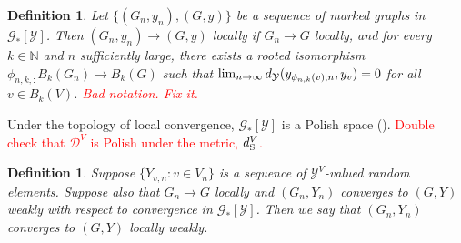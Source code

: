 \documentclass[12pt]{article}
\newcommand{\mb}{\mathbb}
\newcommand{\mc}{\mathcal}
\newcommand{\ra}{\rightarrow}
\newcommand{\te}{\text}
\newcommand{\tr}{\textcolor{red}}
\newcommand{\cad}{\mc{D}}							%
\newcommand{\stmet}[1]{
\ifstrempty{#1}{
	d_{\te{S}}}{
	d_{\te{S},#1}}}									%
\newcommand{\xg}{y}									%
\newcommand{\met}[2]{
\ifstrempty{#2}{
	d_{#1}}{
	d_{#1,#2}}}										%
\newcommand{\vind}[1]{_{#1}}						%
\newcommand{\vpara}[1]{^{#1}}						%
\newcommand{\Gs}{\mc{G}_\ast}						%
\newcommand{\trnc}[1]{B_{#1}}						%
\newcommand{\spce}{\mc{Y}}							%
\renewcommand{\sp}[1]{[#1]}							%
\newcommand{\dit}[2]{_{#1,#2}}						%
\newcommand{\vindit}[2]{_{#1,#2}}					%
\newcommand{\Xg}{Y}									%
\renewcommand{\it}[1]{_{#1}}						%
\newtheorem{defn}[thms]{Definition}
\begin{document}
\begin{defn}
Let \(\{(G\it{n},\xg\it{n}),(G,\xg)\}\) be a sequence of marked graphs in \(\Gs\sp{\spce}\). Then \((G\it{n},\xg\it{n}) \ra (G,\xg)\) locally if \(G\it{n} \ra G\) locally, and for every \(k \in \mb{N}\) and \(n\) sufficiently large, there exists a rooted isomorphism \(\phi\dit{n,k}:\trnc{k}(G\it{n}) \ra \trnc{k}(G)\) such that \(\lim_{n\ra\infty} \met{\spce}{}(\xg\vindit{\phi\dit{n}{k}(v)}{n},\xg\vind{v}) = 0\) for all \(v \in \trnc{k}(V)\). \tr{Bad notation. Fix it.}
\label{lwc::mlc}
\end{defn}

Under the topology of local convergence, \(\Gs\sp{\spce}\) is a Polish space (\cite[Lemmas A.2, A.3, and A.5]{LacRamWu19}). \tr{Double check that \(\cad^V\) is Polish under the metric, \(\stmet{}\vpara{V}\).}

\begin{defn}
Suppose \(\{\Xg\vindit{v}{n}:v \in V\it{n}\}\) is a sequence of \(\spce^V\)-valued random elements. Suppose also that \(G\it{n} \ra G\) locally and \((G\it{n},\Xg\it{n})\) converges to \((G,\Xg)\) weakly with respect to convergence in \(\Gs\sp{\spce}\). Then we say that \((G\it{n},\Xg\it{n})\) converges to \((G,\Xg)\) locally weakly.
\label{lwc::lwc}
\end{defn} 
\end{document}
